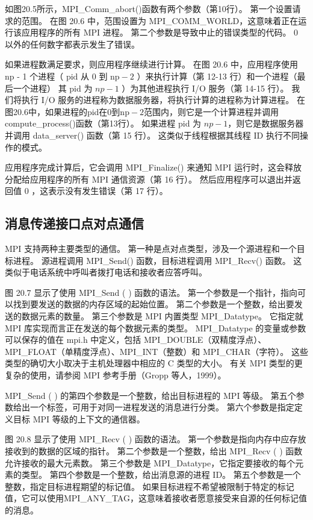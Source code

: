 如图20.5所示，MPI\_Comm\_abort()函数有两个参数（第10行）。 第一个设置请求的范围。 在图 20.6 中，范围设置为 MPI\_COMM\_WORLD，这意味着正在运行该应用程序的所有 MPI 进程。 第二个参数是导致中止的错误类型的代码。 0 以外的任何数字都表示发生了错误。

如果进程数满足要求，则应用程序继续进行计算。 在图 20.6 中，应用程序使用 np - 1 个进程（ $\mathrm{pid}$ 从 0 到 $\mathrm{np}-2$ ）来执行计算（第 12-13 行）和一个进程（最后一个进程） 其 pid 为 $n p-1$ ）为其他进程执行 I/O 服务（第 14-15 行）。 我们将执行 I/O 服务的进程称为数据服务器，将执行计算的进程称为计算进程。 在图20.6中，如果进程的pid在0到$\mathrm{np}-2$范围内，则它是一个计算进程并调用compute\_process()函数（第13行）。 如果进程 pid 为 $n p-1$，则它是数据服务器并调用 data\_server() 函数（第 15 行）。 这类似于线程根据其线程 ID 执行不同操作的模式。

应用程序完成计算后，它会调用 MPI\_Finalize() 来通知 MPI 运行时，这会释放分配给应用程序的所有 MPI 通信资源（第 16 行）。 然后应用程序可以退出并返回值 0 ，这表示没有发生错误（第 17 行）。

\subsection{消息传递接口点对点通信}
MPI 支持两种主要类型的通信。 第一种是点对点类型，涉及一个源进程和一个目标进程。 源进程调用 MPI\_Send() 函数，目标进程调用 MPI\_Recv() 函数。 这类似于电话系统中呼叫者拨打电话和接收者应答呼叫。

图 20.7 显示了使用 MPI\_Send ( ) 函数的语法。 第一个参数是一个指针，指向可以找到要发送的数据的内存区域的起始位置。 第二个参数是一个整数，给出要发送的数据元素的数量。 第三个参数是 MPI 内置类型 MPI\_Datatype。 它指定就 MPI 库实现而言正在发送的每个数据元素的类型。 MPI\_Datatype 的变量或参数可以保存的值在 mpi.h 中定义，包括 MPI\_DOUBLE（双精度浮点）、MPI\_FLOAT（单精度浮点）、MPI\_INT（整数）和 MPI\_CHAR（字符）。 这些类型的确切大小取决于主机处理器中相应的 $\mathrm{C}$ 类型的大小。 有关 MPI 类型的更复杂的使用，请参阅 MPI 参考手册（Gropp 等人，1999）。

MPI\_Send ( ) 的第四个参数是一个整数，给出目标进程的 MPI 等级。 第五个参数给出一个标签，可用于对同一进程发送的消息进行分类。 第六个参数是指定定义目标 MPI 等级的上下文的通信器。

图 20.8 显示了使用 MPI\_Recv ( ) 函数的语法。 第一个参数是指向内存中应存放接收到的数据的区域的指针。 第二个参数是一个整数，给出 MPI\_Recv ( ) 函数允许接收的最大元素数。 第三个参数是 MPI\_Datatype，它指定要接收的每个元素的类型。 第四个参数是一个整数，给出消息源的进程 ID。 第五个参数是一个整数，指定目标进程期望的标记值。 如果目标进程不希望被限制于特定的标记值，它可以使用MPI\_ANY\_TAG，这意味着接收者愿意接受来自源的任何标记值的消息。

